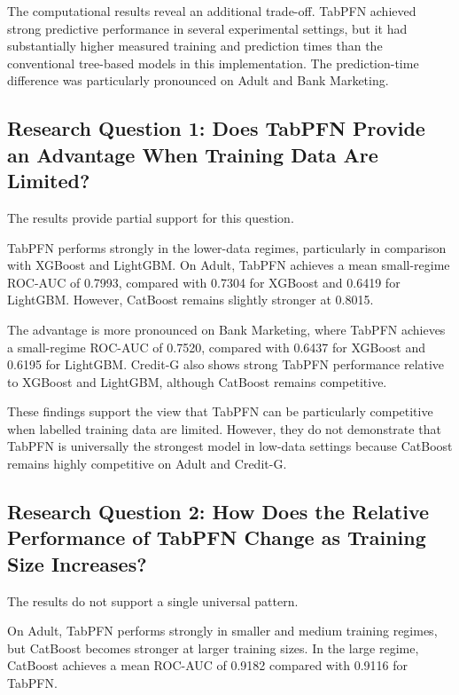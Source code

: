 The computational results reveal an additional trade-off. TabPFN achieved strong predictive performance in several experimental settings, but it had substantially higher measured training and prediction times than the conventional tree-based models in this implementation. The prediction-time difference was particularly pronounced on Adult and Bank Marketing.

\subsection{Research Question 1: Does TabPFN Provide an Advantage When Training Data Are Limited?}\label{research-question-1-does-tabpfn-provide-an-advantage-when-training-data-are-limited}

The results provide partial support for this question.

TabPFN performs strongly in the lower-data regimes, particularly in comparison with XGBoost and LightGBM. On Adult, TabPFN achieves a mean small-regime ROC-AUC of 0.7993, compared with 0.7304 for XGBoost and 0.6419 for LightGBM. However, CatBoost remains slightly stronger at 0.8015.

The advantage is more pronounced on Bank Marketing, where TabPFN achieves a small-regime ROC-AUC of 0.7520, compared with 0.6437 for XGBoost and 0.6195 for LightGBM. Credit-G also shows strong TabPFN performance relative to XGBoost and LightGBM, although CatBoost remains competitive.

These findings support the view that TabPFN can be particularly competitive when labelled training data are limited. However, they do not demonstrate that TabPFN is universally the strongest model in low-data settings because CatBoost remains highly competitive on Adult and Credit-G.

\subsection{Research Question 2: How Does the Relative Performance of TabPFN Change as Training Size Increases?}\label{research-question-2-how-does-the-relative-performance-of-tabpfn-change-as-training-size-increases}

The results do not support a single universal pattern.

On Adult, TabPFN performs strongly in smaller and medium training regimes, but CatBoost becomes stronger at larger training sizes. In the large regime, CatBoost achieves a mean ROC-AUC of 0.9182 compared with 0.9116 for TabPFN.

